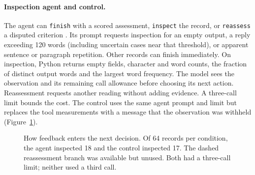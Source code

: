 \documentclass{article}
\begin{document}
\paragraph{Inspection agent and control.}
The agent can \texttt{finish} with a scored assessment, \texttt{inspect} the record, or \texttt{reassess} a disputed criterion \citep{yao2023}. Its prompt requests inspection for an empty output, a reply exceeding 120 words (including uncertain cases near that threshold), or apparent sentence or paragraph repetition. Other records can finish immediately. On inspection, Python returns empty fields, character and word counts, the fraction of distinct output words and the largest word frequency. The model sees the observation and its remaining call allowance before choosing its next action. Reassessment requests another reading without adding evidence. A three-call limit bounds the cost. The control uses the same agent prompt and limit but replaces the tool measurements with a message that the observation was withheld (Figure~\ref{fig:workflow}).

\begin{figure}[ht]
\centering
{}
\caption{How feedback enters the next decision. Of 64 records per condition, the agent inspected 18 and the control inspected 17. The dashed reassessment branch was available but unused. Both had a three-call limit; neither used a third call.}\label{fig:workflow}
\end{figure}
\end{document}
